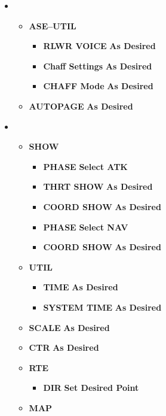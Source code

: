 \documentclass[fontHelvetica]{TechCheck}
\begin{document}
	\begin{itemize}[leftmargin=0.1\linewidth,rightmargin=0.1\linewidth, itemsep=4pt]
		\item {}
		\begin{itemize}[itemsep=4pt]
			\item \textbf{ASE--UTIL}
			\begin{itemize}[itemsep=4pt]
				\item \textbf{RLWR VOICE} \dotfill \textbf{As Desired}
				\item \textbf{Chaff Settings} \dotfill \textbf{As Desired}
				\item \textbf{CHAFF Mode} \dotfill \textbf{As Desired}
			\end{itemize}
			\item \textbf{AUTOPAGE} \dotfill \textbf{As Desired}
		\end{itemize}
		\item {}
		\begin{itemize}[itemsep=4pt]
			\item \textbf{SHOW}
			\begin{itemize}[itemsep=4pt]
				\item \textbf{PHASE} \dotfill \textbf{Select ATK}
				\item \textbf{THRT SHOW} \dotfill \textbf{As Desired}
				\item \textbf{COORD SHOW} \dotfill \textbf{As Desired}
				\item \textbf{PHASE} \dotfill \textbf{Select NAV}
				\item \textbf{COORD SHOW} \dotfill \textbf{As Desired}
			\end{itemize}
			\item \textbf{UTIL}
			\begin{itemize}[itemsep=4pt]
				\item \textbf{TIME} \dotfill \textbf{As Desired}
				\item \textbf{SYSTEM TIME} \dotfill \textbf{As Desired}
			\end{itemize}
			\item \textbf{SCALE} \dotfill \textbf{As Desired}
			\item \textbf{CTR} \dotfill \textbf{As Desired}
			\item \textbf{RTE}
			\begin{itemize}[itemsep=4pt]
				\item \textbf{DIR} \dotfill \textbf{Set Desired Point}
			\end{itemize}
			\item \textbf{MAP}

\end{itemize}
\end{itemize}
\end{document}
